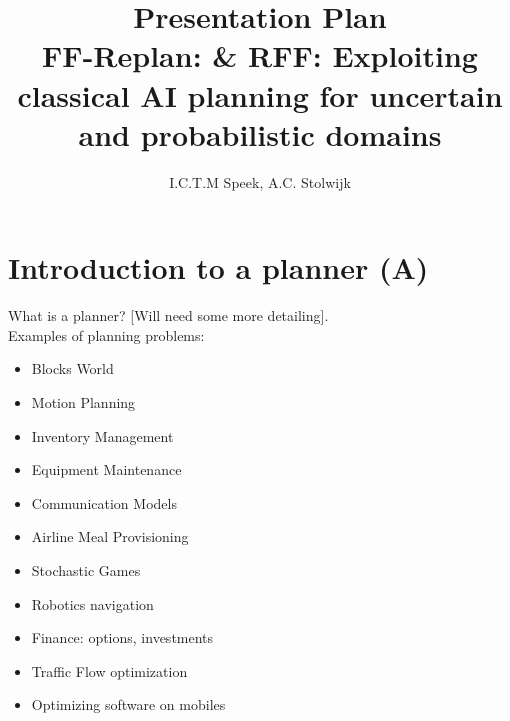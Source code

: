 \documentclass[runningheads,a4paper]{llncs}
\begin{document}
\mainmatter%

\title{Presentation Plan\\
FF-Replan: \& RFF\@: Exploiting classical AI planning for uncertain and probabilistic domains}


\author{I.C.T.M Speek, A.C. Stolwijk}

%



\maketitle

\section{Introduction to a planner (A)}

What is a planner? [Will need some more detailing].\\

Examples of planning problems:

\begin{itemize}
	\item Blocks World
	\item Motion Planning
	\item Inventory Management~\cite{puterman2009markov}
	\item Equipment Maintenance~\cite{puterman2009markov}
	\item Communication Models~\cite{puterman2009markov}
	\item Airline Meal Provisioning
	\item Stochastic Games
	\item Robotics navigation
	\item Finance: options, investments
	\item Traffic Flow optimization
	\item Optimizing software on mobiles
\end{itemize}
\end{document}

